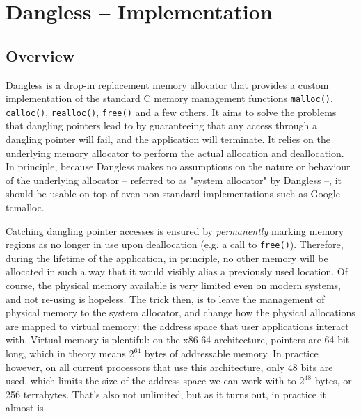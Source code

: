 \chapter{Dangless -- Implementation}
\label{ch:implementation}

\section{Overview}


Dangless is a drop-in replacement memory allocator that provides a custom implementation of the standard C memory management functions \lstinline!malloc()!, \lstinline!calloc()!, \lstinline!realloc()!, \lstinline!free()! and a few others. It aims to solve the problems that dangling pointers lead to by guaranteeing that any access through a dangling pointer will fail, and the application will terminate. It relies on the underlying memory allocator to perform the actual allocation and deallocation. In principle, because Dangless makes no assumptions on the nature or behaviour of the underlying allocator -- referred to as "system allocator" by Dangless --, it should be usable on top of even non-standard implementations such as Google tcmalloc.

Catching dangling pointer accesses is ensured by \emph{permanently} marking memory regions as no longer in use upon deallocation (e.g. a call to \lstinline!free()!). Therefore, during the lifetime of the application, in principle, no other memory will be allocated in such a way that it would visibly alias a previously used location. Of course, the physical memory available is very limited even on modern systems, and not re-using is hopeless. The trick then, is to leave the management of physical memory to the system allocator, and change how the physical allocations are mapped to virtual memory: the address space that user applications interact with. Virtual memory is plentiful: on the x86-64 architecture, pointers are 64-bit long, which in theory means $2^{64}$ bytes of addressable memory. In practice however, on all current processors that use this architecture, only 48 bits are used, which limits the size of the address space we can work with to $2^{48}$ bytes, or 256 terrabytes. That's also not unlimited, but as it turns out, in practice it almost is.

